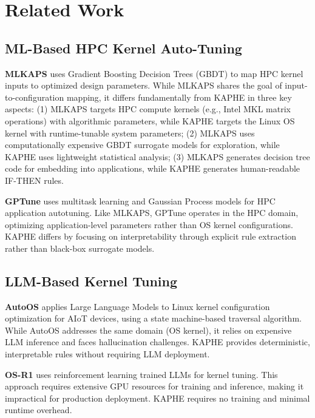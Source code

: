 \documentclass[11pt,a4paper]{article}
\begin{document}
\section{Related Work}
\label{sec:related}

\subsection{ML-Based HPC Kernel Auto-Tuning}

\textbf{MLKAPS} \citep{jam2025mlkaps} uses Gradient Boosting Decision Trees (GBDT) to map HPC kernel inputs to optimized design parameters. While MLKAPS shares the goal of input-to-configuration mapping, it differs fundamentally from KAPHE in three key aspects: (1) MLKAPS targets HPC compute kernels (e.g., Intel MKL matrix operations) with algorithmic parameters, while KAPHE targets the Linux OS kernel with runtime-tunable system parameters; (2) MLKAPS uses computationally expensive GBDT surrogate models for exploration, while KAPHE uses lightweight statistical analysis; (3) MLKAPS generates decision tree code for embedding into applications, while KAPHE generates human-readable IF-THEN rules.

\textbf{GPTune} \citep{liu2021gptune} uses multitask learning and Gaussian Process models for HPC application autotuning. Like MLKAPS, GPTune operates in the HPC domain, optimizing application-level parameters rather than OS kernel configurations. KAPHE differs by focusing on interpretability through explicit rule extraction rather than black-box surrogate models.

\subsection{LLM-Based Kernel Tuning}

\textbf{AutoOS} \citep{chen2024autoos} applies Large Language Models to Linux kernel configuration optimization for AIoT devices, using a state machine-based traversal algorithm. While AutoOS addresses the same domain (OS kernel), it relies on expensive LLM inference and faces hallucination challenges. KAPHE provides deterministic, interpretable rules without requiring LLM deployment.

\textbf{OS-R1} \citep{osr1_2025} uses reinforcement learning trained LLMs for kernel tuning. This approach requires extensive GPU resources for training and inference, making it impractical for production deployment. KAPHE requires no training and minimal runtime overhead.
\end{document}
